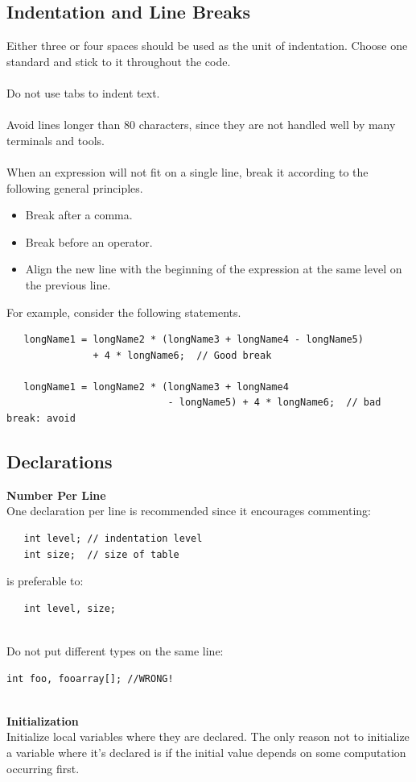 \documentclass{CSSRforAfrica}
\newcommand{\blank}{~\\}
\begin{document}
\begin{appendices}
\subsection{Indentation and Line Breaks}
\label{section:indentation}
Either three or four spaces should be used as the unit of indentation.
Choose one standard and stick to it throughout the code.
\blank
~
\blank
Do not use tabs to indent text.
\blank
~
\blank
Avoid lines longer than 80 characters, since they are not handled well by many
terminals and tools.
\blank
~
\blank
When an expression will not fit on a single line, break it according to the following
general principles.
\begin{itemize}
\item Break after a comma.
\item Break before an operator.
\item Align the new line with the beginning of the expression at the same level on the previous line.
\end{itemize}
For example, consider the following statements.
{\small
\begin{verbatim}
   longName1 = longName2 * (longName3 + longName4 - longName5)
               + 4 * longName6;  // Good break

   longName1 = longName2 * (longName3 + longName4 
                            - longName5) + 4 * longName6;  // bad break: avoid
\end{verbatim}
}

\subsection{Declarations}

{\bf Number Per Line}\\
One declaration per line is recommended  since it encourages commenting:
{\small
\begin{verbatim}
   int level; // indentation level
   int size;  // size of table
\end{verbatim}
}
is preferable to:
{\small
\begin{verbatim}
   int level, size;
\end{verbatim}
}
\blank
Do not put different types on the same line:
{\small
\begin{verbatim}
int foo, fooarray[]; //WRONG!
\end{verbatim}
}
\blank
{\bf Initialization}\\
Initialize local variables where they are declared. The only reason not to initialize a
variable where it's declared is if the initial value depends on some computation occurring first.



\end{appendices}
\end{document}
